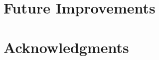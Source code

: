 \documentclass[11pt,letterpaper]{article}
\begin{document}


\section{Future Improvements}

\section*{Acknowledgments}
\end{document}
